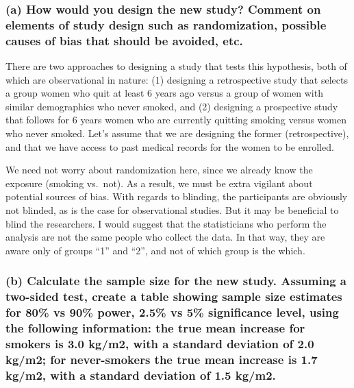 \documentclass[]{article}
\begin{document}
\subsubsection{(a) How would you design the new study? Comment on
elements of study design such as randomization, possible causes of bias
that should be avoided,
etc.}\label{a-how-would-you-design-the-new-study-comment-on-elements-of-study-design-such-as-randomization-possible-causes-of-bias-that-should-be-avoided-etc.}

There are two approaches to designing a study that tests this
hypothesis, both of which are observational in nature: (1) designing a
retrospective study that selects a group women who quit at least 6 years
ago versus a group of women with similar demographics who never smoked,
and (2) designing a prospective study that follows for 6 years women who
are currently quitting smoking versus women who never smoked. Let's
assume that we are designing the former (retrospective), and that we
have access to past medical records for the women to be enrolled.

We need not worry about randomization here, since we already know the
exposure (smoking vs.~not). As a result, we must be extra vigilant about
potential sources of bias. With regards to blinding, the participants
are obviously not blinded, as is the case for observational studies. But
it may be beneficial to blind the researchers. I would suggest that the
statisticians who perform the analysis are not the same people who
collect the data. In that way, they are aware only of groups ``1'' and
``2'', and not of which group is the which.

\subsubsection{(b) Calculate the sample size for the new study. Assuming
a two-sided test, create a table showing sample size estimates for 80\%
vs 90\% power, 2.5\% vs 5\% significance level, using the following
information: the true mean increase for smokers is 3.0 kg/m2, with a
standard deviation of 2.0 kg/m2; for never-smokers the true mean
increase is 1.7 kg/m2, with a standard deviation of 1.5
kg/m2.}\label{b-calculate-the-sample-size-for-the-new-study.-assuming-a-two-sided-test-create-a-table-showing-sample-size-estimates-for-80-vs-90-power-2.5-vs-5-significance-level-using-the-following-information-the-true-mean-increase-for-smokers-is-3.0-kgm2-with-a-standard-deviation-of-2.0-kgm2-for-never-smokers-the-true-mean-increase-is-1.7-kgm2-with-a-standard-deviation-of-1.5-kgm2.}
\end{document}
